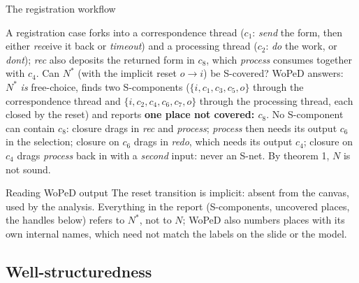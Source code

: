 \begin{examplebox}{The registration workflow}
\begin{center}
\end{center}
A registration case forks into a correspondence thread ($c_1$: \emph{send} the form, then either \emph{rec}eive it back or \emph{timeout}) and a processing thread ($c_2$: \emph{do} the work, or \emph{dont}); \emph{rec} also deposits the returned form in $c_8$, which \emph{process} consumes together with $c_4$. Can $N^{*}$ (with the implicit reset $o \to i$) be S-covered? WoPeD answers: $N^{*}$ \emph{is} free-choice, finds two S-components ($\{i, c_1, c_3, c_5, o\}$ through the correspondence thread and $\{i, c_2, c_4, c_6, c_7, o\}$ through the processing thread, each closed by the reset) and reports \textbf{one place not covered: $c_8$}. No S-component can contain $c_8$: closure drags in \emph{rec} and \emph{process}; \emph{process} then needs its output $c_6$ in the selection; closure on $c_6$ drags in \emph{redo}, which needs its output $c_4$; closure on $c_4$ drags \emph{process} back in with a \emph{second} input: never an S-net. By theorem 1, $N$ is not sound.
\end{examplebox}
\begin{notebox}{Reading WoPeD output}
The reset transition is implicit: absent from the canvas, used by the analysis. Everything in the report (S-components, uncovered places, the handles below) refers to $N^{*}$, not to $N$; WoPeD also numbers places with its own internal names, which need not match the labels on the slide or the model.
\end{notebox}

\subsection{Well-structuredness}

